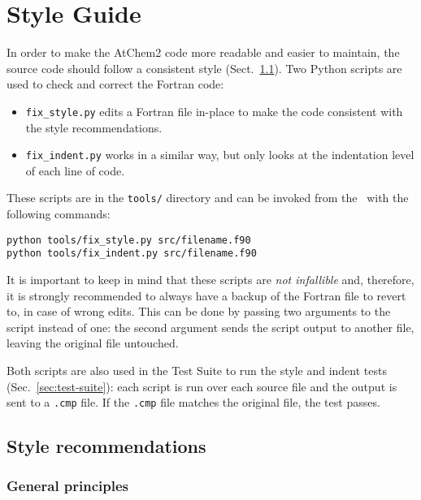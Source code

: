 \section{Style Guide} \label{sec:style-guide}

In order to make the AtChem2 code more readable and easier to
maintain, the source code should follow a consistent style
(Sect.~\ref{subsec:style-recommendations}). Two Python scripts are used
to check and correct the Fortran code:

\begin{itemize}
\item \texttt{fix\_style.py} edits a Fortran file in-place to make the
  code consistent with the style recommendations.
\item \texttt{fix\_indent.py} works in a similar way, but only looks
  at the indentation level of each line of code.
\end{itemize}

These scripts are in the \texttt{tools/} directory and can be invoked
from the \maindir\ with the following commands:

\begin{verbatim}
python tools/fix_style.py src/filename.f90
python tools/fix_indent.py src/filename.f90
\end{verbatim}

It is important to keep in mind that these scripts are \emph{not
  infallible} and, therefore, it is strongly recommended to always
have a backup of the Fortran file to revert to, in case of wrong
edits. This can be done by passing two arguments to the script instead
of one: the second argument sends the script output to another file,
leaving the original file untouched.

Both scripts are also used in the Test Suite to run the style and
indent tests (Sec.~\ref{sec:test-suite}): each script is run over each
source file and the output is sent to a \texttt{.cmp} file. If the
\texttt{.cmp} file matches the original file, the test passes.

\subsection{Style recommendations} \label{subsec:style-recommendations}

\subsubsection{General principles}

